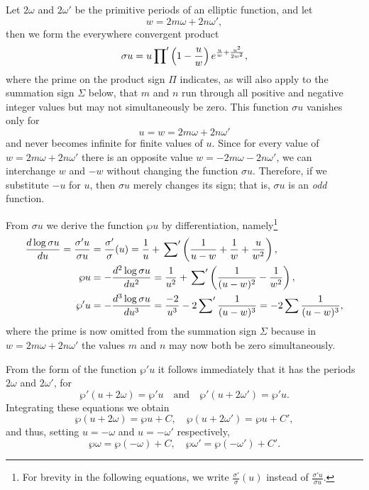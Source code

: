 \documentclass[12pt]{article}
\begin{document}
Let $2\omega$ and $2\omega'$ be the primitive periods of an elliptic function, and let
\begin{equation*}
w = 2m\omega + 2n\omega',
\end{equation*}
then we form the everywhere convergent product
\begin{equation}
\sigma u = u \sideset{}{'}\prod \left(1 - \frac{u}{w}\right) e^{\frac{u}{w} + \frac{u^2}{2w^2}},
\end{equation}
where the prime on the product sign $\Pi$ indicates, as will also apply to the summation sign $\Sigma$ below, that $m$ and $n$ run through all positive and negative integer values but may not simultaneously be zero.
This function $\sigma u$ vanishes only for
\begin{equation*}
u = w = 2m\omega + 2n\omega'
\end{equation*}
and never becomes infinite for finite values of $u$. Since for every value of $w = 2m\omega + 2n\omega'$ there is an opposite value $w = -2m\omega - 2n\omega'$, we can interchange $w$ and $-w$ without changing the function $\sigma u$. Therefore, if we substitute $-u$ for $u$, then $\sigma u$ merely changes its sign; that is, $\sigma u$ is an \emph{odd} function.

From $\sigma u$ we derive the function $\wp u$ by differentiation, namely\footnote{For brevity in the following equations, we write $\frac{\sigma'}{\sigma}(u)$ instead of $\frac{\sigma' u}{\sigma u}$.}
\begin{align*}
\frac{d\log \sigma u}{du} = \frac{\sigma' u}{\sigma u} &= \frac{\sigma'}{\sigma}(u) = \frac{1}{u} + \sideset{}{'}\sum \left(\frac{1}{u-w} + \frac{1}{w} + \frac{u}{w^2}\right),\\
\wp u &= -\frac{d^2\log \sigma u}{du^2} = \frac{1}{u^2} + \sideset{}{'}\sum \left(\frac{1}{(u-w)^2} - \frac{1}{w^2}\right),\\
\wp' u &= -\frac{d^3\log \sigma u}{du^3} = \frac{-2}{u^3} - 2\sideset{}{'}\sum \frac{1}{(u-w)^3} = -2\sum \frac{1}{(u-w)^3},
\end{align*}
where the prime is now omitted from the summation sign $\Sigma$ because in $w = 2m\omega + 2n\omega'$ the values $m$ and $n$ may now both be zero simultaneously.

From the form of the function $\wp' u$ it follows immediately that it has the periods $2\omega$ and $2\omega'$, for
\begin{equation*}
\wp'(u+2\omega) = \wp' u \quad \text{and} \quad \wp'(u+2\omega') = \wp' u.
\end{equation*}
Integrating these equations we obtain
\begin{equation*}
\wp(u+2\omega) = \wp u + C, \quad \wp(u+2\omega') = \wp u + C',
\end{equation*}
and thus, setting $u = -\omega$ and $u = -\omega'$ respectively,
\begin{equation*}
\wp \omega = \wp(-\omega) + C, \quad \wp \omega' = \wp(-\omega') + C'.
\end{equation*}
\end{document}
